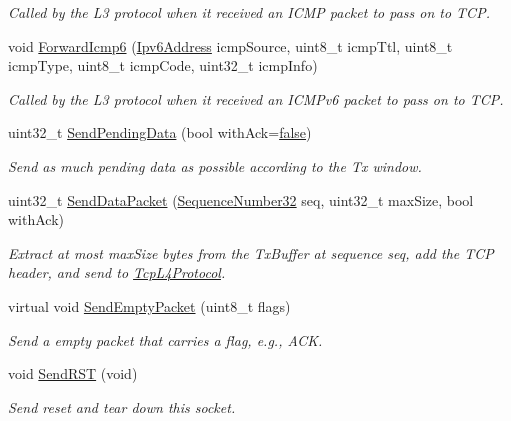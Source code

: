 \begin{DoxyCompactItemize}
\begin{DoxyCompactList}\small\item\em Called by the L3 protocol when it received an I\+C\+MP packet to pass on to T\+CP. \end{DoxyCompactList}\item 
void \hyperlink{classns3_1_1TcpSocketBase_ad55d818db7149e0c2db0ce5eb6810beb}{Forward\+Icmp6} (\hyperlink{classns3_1_1Ipv6Address}{Ipv6\+Address} icmp\+Source, uint8\+\_\+t icmp\+Ttl, uint8\+\_\+t icmp\+Type, uint8\+\_\+t icmp\+Code, uint32\+\_\+t icmp\+Info)
\begin{DoxyCompactList}\small\item\em Called by the L3 protocol when it received an I\+C\+M\+Pv6 packet to pass on to T\+CP. \end{DoxyCompactList}\item 
uint32\+\_\+t \hyperlink{classns3_1_1TcpSocketBase_a129ac0ec5fc399fa7c5552c615ae6562}{Send\+Pending\+Data} (bool with\+Ack=\hyperlink{lte__cqi__generation_8m_ab1bef239d413c4da139c4bac92cd657a}{false})
\begin{DoxyCompactList}\small\item\em Send as much pending data as possible according to the Tx window. \end{DoxyCompactList}\item 
uint32\+\_\+t \hyperlink{classns3_1_1TcpSocketBase_a677488c04da1df87f916953a40e1bd64}{Send\+Data\+Packet} (\hyperlink{group__network_gacb2070e4e98d2d5135c9bede58f07a03}{Sequence\+Number32} seq, uint32\+\_\+t max\+Size, bool with\+Ack)
\begin{DoxyCompactList}\small\item\em Extract at most max\+Size bytes from the Tx\+Buffer at sequence seq, add the T\+CP header, and send to \hyperlink{classns3_1_1TcpL4Protocol}{Tcp\+L4\+Protocol}. \end{DoxyCompactList}\item 
virtual void \hyperlink{classns3_1_1TcpSocketBase_aa858913c9a4480a14d293f1014905b3e}{Send\+Empty\+Packet} (uint8\+\_\+t flags)
\begin{DoxyCompactList}\small\item\em Send a empty packet that carries a flag, e.\+g., A\+CK. \end{DoxyCompactList}\item 
void \hyperlink{classns3_1_1TcpSocketBase_a070b9ac86f372fe0b661050686bef68e}{Send\+R\+ST} (void)
\begin{DoxyCompactList}\small\item\em Send reset and tear down this socket. \end{DoxyCompactList}\item 

\end{DoxyCompactItemize}
